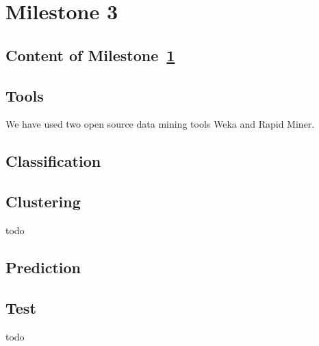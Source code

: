 


\chapter{Milestone 3} \label{cha:ml3}
    \section{Content of Milestone~\ref{cha:ml3}} 
        \label{sec:ml3_content}
    

    \section{Tools} %
    \label{sub:Tools}
    We have used two open source data mining tools Weka and Rapid Miner.
    
    

    \section{Classification} %
    \label{sub:Classification}
    

    \section{Clustering} %
    \label{sub:Clustering}
    todo

    \section{Prediction} %
    \label{sub:Prediction}
    

    \section{Test} %
    todo
    \label{sec:Test}



